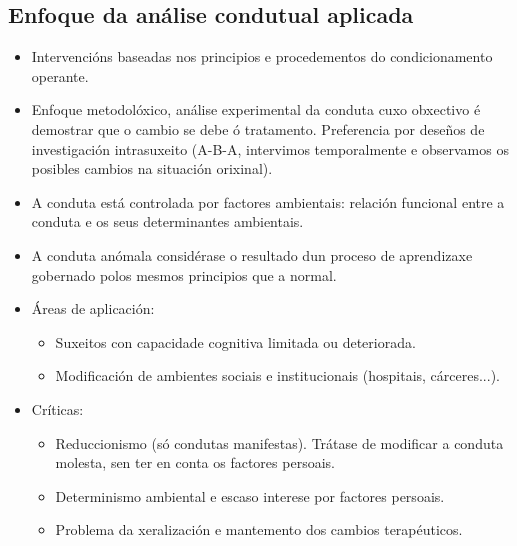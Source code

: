 \documentclass[a4paper,11pt]{article}
\begin{document}
\subsection{Enfoque da análise condutual aplicada}
\begin{itemize}
	\item Intervencións baseadas nos principios e procedementos do condicionamento operante.
	\item Enfoque metodolóxico, análise experimental da conduta cuxo obxectivo é demostrar que o 
	cambio se debe ó tratamento. Preferencia por deseños de investigación intrasuxeito (A-B-A, 
	intervimos temporalmente e observamos os posibles cambios na situación orixinal).
	\item A conduta está controlada por factores ambientais: relación funcional entre a conduta e os 
	seus determinantes ambientais.
	\item A conduta anómala considérase o resultado dun proceso de aprendizaxe gobernado polos 
	mesmos principios que a normal. 
	\item Áreas de aplicación:
	\begin{itemize}
		\item Suxeitos con capacidade cognitiva limitada ou deteriorada.
		\item Modificación de ambientes sociais e institucionais (hospitais, cárceres...).
	\end{itemize}
	\item Críticas:
	\begin{itemize}
		\item Reduccionismo (só condutas manifestas). Trátase de modificar a conduta molesta, sen ter 
		en conta os factores persoais.
		\item Determinismo ambiental e escaso interese por factores persoais.
		\item Problema da xeralización e mantemento dos cambios terapéuticos.
	\end{itemize}
\end{itemize}
\end{document}

